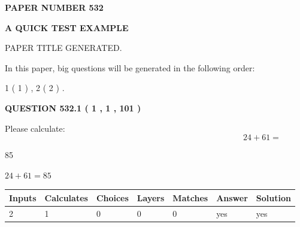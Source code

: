 \documentclass[12pt]{article}
\begin{document}
   
   
   
 {\textbf{ \Large{ PAPER NUMBER  532  }}}
   
   
\vspace{0.2in}
   
   
   
   
   
   
   
   
 \vspace{0.2in}
{\LARGE {\textbf{ A QUICK TEST EXAMPLE}}}
   
   
 PAPER TITLE GENERATED.
   
   
   
\vspace{0.2in}
   
In this paper, big questions will be generated in the following order: 
   
   
   1 ( 1 )
 ,
   2 ( 2 )
 .
  
\vspace{0.2in}
  
{\textbf{\Large{QUESTION
532.1 
 ( 1 , 1 , 101 )
}}}
  
  
 
Please calculate:
\begin{equation}
24 +  %
61 = \nonumber
\end{equation}
 
 
 
\noindent{}
 
 

85
 
 
\noindent{}
 
 

 
 
 
\noindent{}
 
 

$ %
24 +  %
61=   %
85$
 
 
\noindent{}
 
 

 
   
   
   
   
\noindent\begin{tabular}{|l|l|l|l|l|l|l|}
 \hline
Inputs & Calculates & Choices & Layers & Matches & Answer & Solution \\ \hline
 2  & 
 1  & 
 0
  & 
 0  & 
 0  & 
  yes & 
  yes 
  \\ \hline
 \end{tabular}
   
\end{document}
